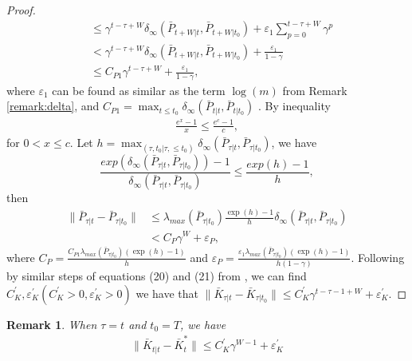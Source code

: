 \documentclass[letterpaper, 10 pt, conference]{ieeeconf}  %
\newtheorem{remark}{Remark}
\begin{document}
\begin{proof}
\begin{align*}
        &\leq \gamma^{t-\tau+W}\delta_{\infty}(\bar{P}_{t+W|t},\bar{P}_{t+W|t_{0}}) + \varepsilon_{1}\sum_{p=0}^{t-\tau+W}\gamma^{p}\\
        &< \gamma^{t-\tau+W}\delta_{\infty}(\bar{P}_{t+W|t},\bar{P}_{t+W|t_{0}}) + \frac{\varepsilon_{1}}{1-\gamma}\\
        &\leq C_{P1}\gamma^{t-\tau+W}+\frac{\varepsilon_{1}}{1-\gamma},
    \end{align*}
    where $\varepsilon_{1}$ can be found as similar as the term $\log(m)$ from Remark \ref{remark:delta}, and $C_{P1} = \max_{t\leq t_{0}} \delta_{\infty}(\bar{P}_{t|t},\bar{P}_{t|t_{0}})$ . By inequality
    \begin{align*}
        \frac{e^{x}-1}{x} \leq \frac{e^{c}-1}{c},
    \end{align*}
    for $0 < x \leq c$. Let $h = \max_{(\tau,t_{0}| \tau,\leq t_{0})} \delta_{\infty}(\bar{P}_{\tau|t},\bar{P}_{\tau|t_{0}})$, we have
    \begin{equation}
        \frac{exp(\delta_{\infty}(\bar{P}_{\tau|t},\bar{P}_{\tau|t_{0}}))-1}{\delta_{\infty}(\bar{P}_{\tau|t},\bar{P}_{\tau|t_{0}})} \leq \frac{exp(h)-1}{h},
    \end{equation}
    then
    \begin{align*}
        \|\bar{P}_{\tau|t}-\bar{P}_{\tau|t_{0}}\| &\leq \lambda_{max}(\bar{P}_{\tau|t_{0}})\frac{\exp(h)-1}{h}\delta_{\infty}(\bar{P}_{\tau|t},\bar{P}_{\tau|t_{0}})\\
        &< C_{P}\gamma^{W}+\varepsilon_{P},
    \end{align*}
    where $C_{P} = \frac{C_{P1}\lambda_{max}(\bar{P}_{\tau|t_{0}})(\exp(h)-1)}{h}$ and $\varepsilon_{P} = \frac{\varepsilon_{1}\lambda_{max}(\bar{P}_{\tau|t_{0}})(\exp(h)-1)}{h(1-\gamma)}$. Following by similar steps of equations (20) and (21) from \cite[Lemma 8]{chen_regret_2022}, we can find $C_{K}^{'},\varepsilon_{K}^{'}(C_{K}^{'}>0,\varepsilon_{K}^{'}>0)$ we have that $\|\bar{K}_{\tau|t}-\bar{K}_{\tau|t_{0}}\| \leq C_{K}^{'}\gamma^{t-\tau-1+W}+\varepsilon_{K}^{'}$.
\end{proof}

\begin{remark}
    When $\tau = t$ and $t_{0} = T$, we have
    \begin{align*}
        \|\bar{K}_{t|t}-\bar{K}_{t}^{*}\| \leq C_{K}^{'}\gamma^{W-1} + \varepsilon_{K}^{'}
    \end{align*}
\end{remark}
\end{document}
